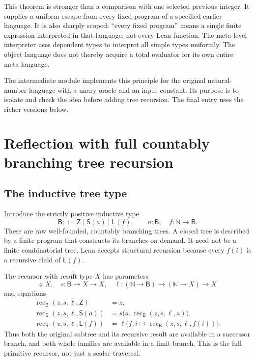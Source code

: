 \documentclass[11pt,a4paper]{article}
\theoremstyle{definition}
\newcommand{\N}{\mathbb N}
\newcommand{\B}{\mathsf B}
\newcommand{\code}[1]{\texttt{\detokenize{#1}}}
\begin{document}
This theorem is stronger than a comparison with one selected previous
integer. It supplies a uniform escape from every fixed program of a specified
earlier language. It is also sharply scoped: ``every fixed program'' means
a single finite expression interpreted in that language, not every Lean
function. The meta-level interpreter uses dependent types to interpret all
simple types uniformly. The object language does not thereby acquire a
total evaluator for its own entire meta-language.

The intermediate \code{Reflection.lean} module implements this principle for
the original natural-number language with a unary oracle and an input
constant. Its purpose is to isolate and check the idea before adding tree
recursion. The final entry uses the richer versions below.

\section{Reflection with full countably branching tree recursion}
\label{sec:arboreal}

\subsection{The inductive tree type}

Introduce the strictly positive inductive type
\[
 \B ::= \mathsf Z\mid\mathsf S(a)\mid
          \mathsf L(f),\qquad a:\B,\quad f:\N\to\B.
\]
These are raw well-founded, countably branching trees. A closed tree is
described by a finite program that constructs its branches on demand. It
need not be a finite combinatorial tree. Lean accepts structural recursion
because every \(f(i)\) is a recursive child of \(\mathsf L(f)\).

The recursor with result type \(X\) has parameters
\[
 z:X,\quad s:\B\to X\to X,\quad
 \ell:(\N\to\B)\to(\N\to X)\to X
\]
and equations
\begin{align*}
 \operatorname{rec}_{\B}(z,s,\ell,\mathsf Z)&=z,\\
 \operatorname{rec}_{\B}(z,s,\ell,\mathsf S(a))
   &=s\bigl(a,\operatorname{rec}_{\B}(z,s,\ell,a)\bigr),\\
 \operatorname{rec}_{\B}(z,s,\ell,\mathsf L(f))
   &=\ell\bigl(f,i\mapsto\operatorname{rec}_{\B}(z,s,\ell,f(i))\bigr).
\end{align*}
Thus both the original subtree and its recursive result are available in a
successor branch, and both whole families are available in a limit branch.
This is the full primitive recursor, not just a scalar traversal.
\end{document}
